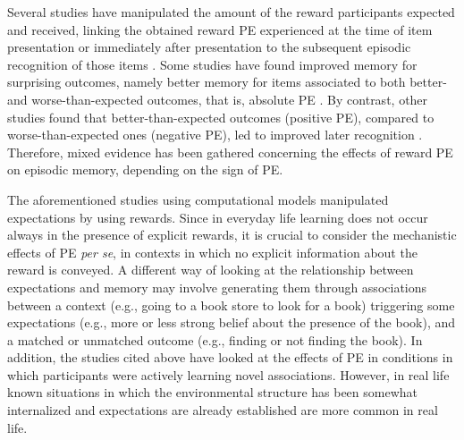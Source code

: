\documentclass[a4paper,12pt]{article}
\begin{document}
Several studies have manipulated the amount of the reward participants expected and received, linking the obtained reward PE experienced at the time of item presentation or immediately after presentation to the subsequent episodic recognition of those items \citep{Rouhani2018,Rouhani2021, Jang2019, de2018signed}. Some studies have found improved memory for surprising outcomes, namely better memory for items associated to both better- and worse-than-expected outcomes, that is, absolute PE \citep{Rouhani2018, Rouhani2021}. By contrast, other studies found that better-than-expected outcomes (positive PE), compared to worse-than-expected ones (negative PE), led to improved later recognition \cite[][Experiment 2 ]{Jang2019, de2018signed}. Therefore, mixed evidence has been gathered concerning the effects of reward PE on episodic memory, depending on the sign of PE. \par%
The aforementioned studies using computational models manipulated expectations by using rewards. Since in everyday life learning does not occur always in the presence of explicit rewards, it is crucial to consider the mechanistic effects of PE \textit{per se}, in contexts in which no explicit information about the reward is conveyed. A different way of looking at the relationship between expectations and memory may involve generating them through associations between a context (e.g., going to a book store to look for a book) triggering some expectations (e.g., more or less strong belief about the presence of the book), and a matched or unmatched outcome (e.g., finding or not finding the book). 
In addition, the studies cited above have looked at the effects of PE in conditions in which participants were actively learning novel associations. However, in real life known situations in which the environmental structure has been somewhat internalized and expectations are already established are more common in real life.  
\end{document}
